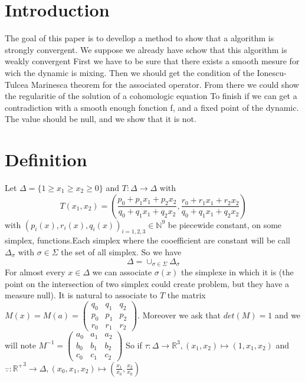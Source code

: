 \documentclass[12pt]{article}
\theoremstyle{plain}%
\theoremstyle{definition}
\theoremstyle{remark}
\begin{document}
\tableofcontents
\section*{Introduction}
The goal of this paper is to devellop a method to show that a algorithm is strongly convergent.
We suppose we already have schow that this algorithm is weakly convergent
First we have to be sure that there exists a smooth mesure for wich the dynamic is mixing.
Then we should get the condition of the Ionescu-Tulcea Marinesca theorem for the associated operator.
From there we could show the regularitie of the solution of a cohomologic equation
To finish if we can get a contradiction with a smooth enough fonction f, and a fixed point of the dynamic. The value should be null, and we show that it is not.

\section{Definition}%
Let $\Delta=\{ 1 \geq x_1 \geq x_2 \geq 0 \}$ and $T:\Delta \to \Delta$ with \[ T(x_1,x_2)=(\frac{p_0+p_1 x_1+p_2 x_2}{q_0+q_1 x_1 +q_2 x_2},\frac{r_0+r_1 x_1+r_2 x_2}{q_0+q_1 x_1 +q_2 x_2}) \] with $(p_i(x),r_i(x),q_i(x))_{i=1,2,3}\in \mathbb{N}^9$ be piecewide constant, on some simplex, functions.Each simplex where the cooefficient are constant will be call $\Delta_\sigma$ with $\sigma \in \Sigma$ the set of all simplex. So we have
\[
\Delta = \cup_{\sigma \in \Sigma} \Delta_\sigma
\]
For almost every $x \in \Delta$ we can associate $\sigma(x)$ the simplexe in which it is (the point on the intersection of two simplex could create problem, but they have a measure null).
\newline It is natural to associate to $T$ the matrix $M(x)=M(a)=\begin{pmatrix} q_0 & q_1 & q_2 \\ p_0 & p_1 & p_2 \\ r_0 & r_1 & r_2 \end{pmatrix}$. Moreover we ask that $det(M)=1$ and we will note $M^{-1}=\begin{pmatrix} a_0 & a_1 & a_2 \\ b_0 & b_1 & b_2 \\ c_0 & c_1 & c_2 \end{pmatrix}$%
\newline
So if $\tau: \Delta \to \mathbb{R}^3, (x_1,x_2) \mapsto (1,x_1,x_2)$ and $\overset{-}{.}: \mathbb{R^+}^3 \to \Delta,(x_0,x_1,x_2) \mapsto (\frac{x_1}{x_0},\frac{x_2}{x_0})$
\end{document}
